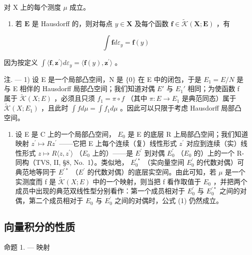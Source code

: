 对 X 上的每个测度 \(\mu\) 成立。

\begin{enumerate}
\def\labelenumi{\arabic{enumi})}
\setcounter{enumi}{2}
\tightlist
\item
  若 \(\mathbf{E}\) 是 Hausdorff 的，则对每点 \(y \in \mathbf{X}\) 及每个函数 \(\mathbf{f} \in \widetilde{\mathcal{K}}(\mathbf{X};\mathbf{E})\) ，有
\end{enumerate}

\[
\int \mathbf {f} d \varepsilon_ {y} = \mathbf {f} (y)
\]

因为按定义 \(\int \langle \mathbf{f},\mathbf{z}^{\prime}\rangle d\varepsilon_{y} = \langle \mathbf{f}(y),\mathbf{z}^{\prime}\rangle\) 。

注. --- 1) 设 E 是一个局部凸空间，N 是 \(\{0\}\) 在 E 中的闭包，于是 \(E_{1} = E/N\) 是与 E 相伴的 Hausdorff 局部凸空间；我们知道对偶 \(E'\) 与 \(E_{1}'\) 相同；为使函数 f 属于 \(\widetilde{\mathcal{K}}(X;E)\) ，必须且只须 \(f_{1} = \pi \circ f\) （其中 \(\pi : E \to E_{1}\) 是典范同态）属于 \(\widetilde{\mathcal{K}}(X;E_{1})\) ，且此时 \(\int f d\mu = \int f_{1} d\mu\) 。因此可以只限于考虑 Hausdorff 局部凸空间。

\begin{enumerate}
\def\labelenumi{\arabic{enumi})}
\setcounter{enumi}{1}
\tightlist
\item
  设 E 是 C 上的一个局部凸空间， \(E_{0}\) 是 E 的底层 R 上局部凸空间；我们知道映射 \(z^{\prime} \mapsto Rz^{\prime}\) ——它把 E 上每个连续（复）线性形式 \(z^{\prime}\) 对应到连续（实）线性形式 \(z \mapsto R\langle z, z^{\prime} \rangle\) （\(E_{0}\) 上的）——是 \(E^{\prime}\) 到对偶 \(E_{0}^{\prime}\) （\(E_{0}\) 的）上的一个 R-同构（TVS, II, §8, No.~1）。类似地， \(E_{0}^{\prime *}\) （实向量空间 \(E_{0}^{\prime}\) 的代数对偶）可典范地等同于 \(E^{\prime *}\) （\(E^{\prime}\) 的代数对偶）的底层实空间。由此可知，若 \(\mu\) 是一个实测度而 f 是 \(\widetilde{\mathcal{K}}(X;E)\) 中的一个映射，则当把 f 看作取值于 \(E_{0}\) ，并把两个成员中出现的典范双线性型分别看作：第一个成员相对于 \(E_{0}^{\prime}\) 与 \(E_{0}^{\prime *}\) 之间的对偶，第二个成员相对于 \(E_{0}\) 与 \(E_{0}^{\prime}\) 之间的对偶时，公式 (1) 仍然成立。
\end{enumerate}

\subsection{向量积分的性质}

命题 1. --- 映射

